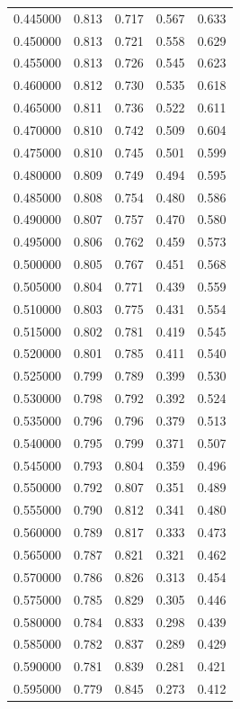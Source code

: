 \begin{table}[htbp]
\begin{tabular}{lllll}
0.445000 & 0.813 & 0.717 & 0.567 & 0.633 \\
0.450000 & 0.813 & 0.721 & 0.558 & 0.629 \\
0.455000 & 0.813 & 0.726 & 0.545 & 0.623 \\
0.460000 & 0.812 & 0.730 & 0.535 & 0.618 \\
0.465000 & 0.811 & 0.736 & 0.522 & 0.611 \\
0.470000 & 0.810 & 0.742 & 0.509 & 0.604 \\
0.475000 & 0.810 & 0.745 & 0.501 & 0.599 \\
0.480000 & 0.809 & 0.749 & 0.494 & 0.595 \\
0.485000 & 0.808 & 0.754 & 0.480 & 0.586 \\
0.490000 & 0.807 & 0.757 & 0.470 & 0.580 \\
0.495000 & 0.806 & 0.762 & 0.459 & 0.573 \\
0.500000 & 0.805 & 0.767 & 0.451 & 0.568 \\
0.505000 & 0.804 & 0.771 & 0.439 & 0.559 \\
0.510000 & 0.803 & 0.775 & 0.431 & 0.554 \\
0.515000 & 0.802 & 0.781 & 0.419 & 0.545 \\
0.520000 & 0.801 & 0.785 & 0.411 & 0.540 \\
0.525000 & 0.799 & 0.789 & 0.399 & 0.530 \\
0.530000 & 0.798 & 0.792 & 0.392 & 0.524 \\
0.535000 & 0.796 & 0.796 & 0.379 & 0.513 \\
0.540000 & 0.795 & 0.799 & 0.371 & 0.507 \\
0.545000 & 0.793 & 0.804 & 0.359 & 0.496 \\
0.550000 & 0.792 & 0.807 & 0.351 & 0.489 \\
0.555000 & 0.790 & 0.812 & 0.341 & 0.480 \\
0.560000 & 0.789 & 0.817 & 0.333 & 0.473 \\
0.565000 & 0.787 & 0.821 & 0.321 & 0.462 \\
0.570000 & 0.786 & 0.826 & 0.313 & 0.454 \\
0.575000 & 0.785 & 0.829 & 0.305 & 0.446 \\
0.580000 & 0.784 & 0.833 & 0.298 & 0.439 \\
0.585000 & 0.782 & 0.837 & 0.289 & 0.429 \\
0.590000 & 0.781 & 0.839 & 0.281 & 0.421 \\
0.595000 & 0.779 & 0.845 & 0.273 & 0.412 \\

\end{tabular}
\end{table}
